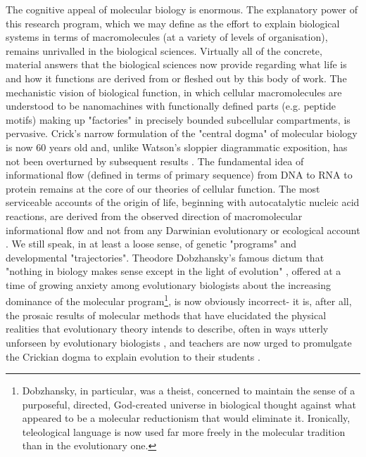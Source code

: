 The cognitive appeal of molecular biology is enormous. The explanatory power of this research program, which we may define as the effort to explain biological systems in terms of macromolecules (at a variety of levels of organisation), remains unrivalled in the biological sciences. Virtually all of the concrete, material answers that the biological sciences now provide regarding what life is and how it functions are derived from or fleshed out by this body of work. The mechanistic vision of biological function, in which cellular macromolecules are understood to be nanomachines with functionally defined parts (e.g. peptide motifs) making up "factories" in precisely bounded subcellular compartments, is pervasive. Crick's narrow formulation of the "central dogma" of molecular biology is now 60 years old and, unlike Watson's sloppier diagrammatic exposition, has not been overturned by subsequent results \cite{Morange2008a}. The fundamental idea of informational flow (defined in terms of primary sequence) from DNA to RNA to protein remains at the core of our theories of cellular function. The most serviceable accounts of the origin of life, beginning with autocatalytic nucleic acid reactions, are derived from the observed direction of macromolecular informational flow and not from any Darwinian evolutionary or ecological account \cite{Kauffman2000}. We still speak, in at least a loose sense, of genetic "programs" and developmental "trajectories". Theodore Dobzhansky's famous dictum that "nothing in biology makes sense except in the light of evolution" \cite{Dobzhansky1973}, offered at a time of growing anxiety among evolutionary biologists about the increasing dominance of the molecular program\footnote{Dobzhansky, in particular, was a theist, concerned to maintain the sense of a purposeful, directed, God-created universe in biological thought against what appeared to be a molecular reductionism that would eliminate it. Ironically, teleological language is now used far more freely in the molecular tradition than in the evolutionary one.}, is now obviously incorrect- it is, after all, the prosaic results of molecular methods that have elucidated the physical realities that evolutionary theory intends to describe, often in ways utterly unforseen by evolutionary biologists \cite{Shapiro2016}, and teachers are now urged to promulgate the Crickian dogma to explain evolution to their students \cite{Kalinowski2010}.

